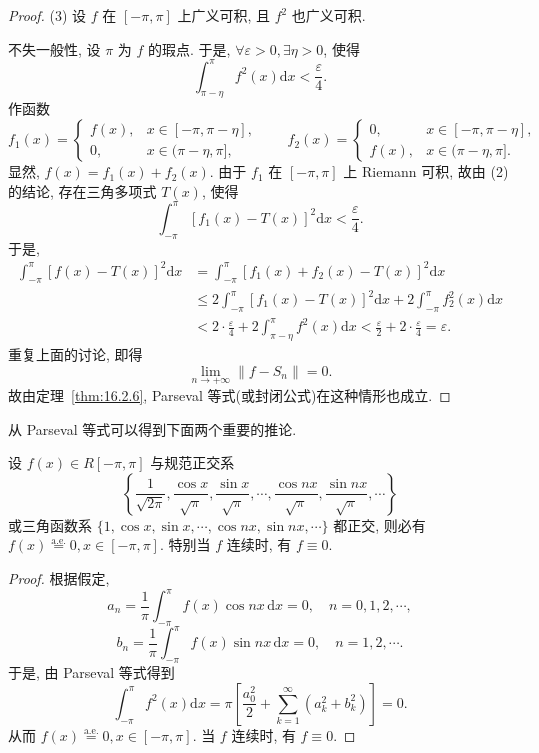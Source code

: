 \begin{proof}
(3) 设 $f$ 在 $[-\pi, \pi]$ 上广义可积, 且 $f^{2}$ 也广义可积.

不失一般性, 设 $\pi$ 为 $f$ 的瑕点. 于是, $\forall \varepsilon > 0, \exists \eta > 0$, 使得
\[
  \int_{\pi-\eta}^{\pi}f^{2}(x)\mathrm{d}x<\frac{\varepsilon}{4}.
\]
作函数
\[
  f_{1}(x)=\begin{cases}
    f(x), & x\in[-\pi,\pi-\eta],\\
    0, & x\in(\pi-\eta,\pi],
\end{cases}\qquad
  f_{2}(x)=\begin{cases}
    0, & x\in[-\pi,\pi-\eta],\\
    f(x), & x\in(\pi-\eta,\pi].
\end{cases}
\]
显然, $f(x)=f_{1}(x)+f_{2}(x)$. 由于 $f_{1}$ 在 $[-\pi,\pi]$ 上 Riemann 可积, 故由 (2) 的结论, 存在三角多项式 $T(x)$, 使得
\[
  \int_{-\pi}^{\pi}\left[f_{1}(x)-T(x)\right]^{2}\mathrm{d}x<\frac{\varepsilon}{4}.
\]
于是,
\[
  \begin{aligned}
    \int_{-\pi}^{\pi}\left[f(x)-T(x)\right]^{2}\mathrm{d}x&= \int_{-\pi}^{\pi}\left[f_{1}(x)+f_{2}(x)-T(x)\right]^{2}\mathrm{d}x\\
    &\leqslant2\int_{-\pi}^{\pi}\left[f_{1}(x)-T(x)\right]^{2}\mathrm{d}x+2\int_{-\pi}^{\pi}f_{2}^{2}(x)\mathrm{d}x\\
    &<2\cdot\frac{\varepsilon}{4}+2\int_{\pi-\eta}^{\pi}f^{2}(x)\mathrm{d}x<\frac{\varepsilon}{2}+2\cdot\frac{\varepsilon}{4}=\varepsilon.
  \end{aligned}
\]
重复上面的讨论, 即得
\[
  \lim_{n\to+\infty}\| f-S_{n}\|=0.
\]
故由定理~\ref{thm:16.2.6}, Parseval 等式(或封闭公式)在这种情形也成立.
\end{proof}

从 Parseval 等式可以得到下面两个重要的推论.

\begin{corollary}\label{cor:16.2.2}
设 $f(x) \in R[-\pi,\pi]$ 与规范正交系
\[
  \left\{\frac{1}{\sqrt{2\pi}},\frac{\cos x}{\sqrt{\pi}},\frac{\sin x}{\sqrt{\pi}},\cdots,\frac{\cos nx}{\sqrt{\pi}},\frac{\sin nx}{\sqrt{\pi}},\cdots\right\}
\]
或三角函数系 $\{1,\cos x,\sin x,\cdots,\cos nx,\sin nx,\cdots\}$ 都正交, 则必有 $f(x)\overset{\mathrm{a.e.}}{=}0,x\in[-\pi,\pi]$. 特别当 $f$ 连续时, 有 $f\equiv0$.
\end{corollary}

\begin{proof}
根据假定,
\[
  a_{n}=\frac{1}{\pi}\int_{-\pi}^{\pi}f(x)\cos n x\,\mathrm{d}x=0,\quad n=0,1,2,\cdots,
\]
\[
  b_{n}=\frac{1}{\pi}\int_{-\pi}^{\pi}f(x)\sin n x\,\mathrm{d}x=0,\quad n=1,2,\cdots.
\]
于是, 由 Parseval 等式得到
\[
  \int_{-\pi}^{\pi}f^{2}(x)\mathrm{d}x=\pi\left[\frac{a_{0}^{2}}{2}+\sum_{k=1}^{\infty}(a_{k}^{2}+b_{k}^{2})\right]=0.
\]
从而 $f(x)\overset{\mathrm{a.e.}}{=}0, x\in[-\pi, \pi]$. 当 $f$ 连续时, 有 $f\equiv0$.
\end{proof}

